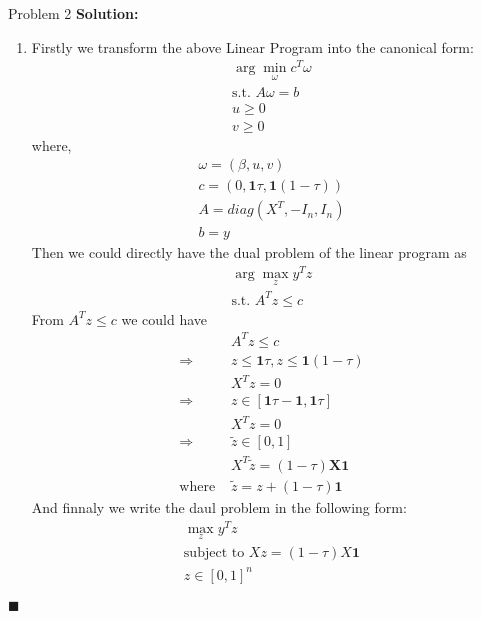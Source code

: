 \documentclass{article}
\newenvironment{solution}                               %
{\textbf{Solution:} }{$\blacksquare$}                   %
\renewcommand{\vec}[1]{\mathbf{#1}}                     %
\begin{document}
\begin{section}{Problem 2}
\begin{solution}
\begin{enumerate}[label=(\alph*)]
                \item %
                Firstly we transform the above Linear Program into the canonical form:
                \begin{gather*}
                    \arg\min\limits_{\omega} c^T \omega \\
                    \text{s.t. } A \omega = b \\
                    u \geq 0 \\
                    v \geq 0
                \end{gather*}
                where, 
                \begin{gather*}
                    \omega = (\beta, u, v) \\
                    c = (0, \vec{1}\tau, \vec{1}(1-\tau)) \\
                    A = diag(X^T, -I_n, I_n)\\
                    b = y
                \end{gather*}
                Then we could directly have the dual problem of the linear program as
                \begin{gather*}
                    \arg\max_{z} y^T z \\
                    \text{s.t. } A^T z \leq c
                \end{gather*}
                From $A^T z \leq c$ we could have
                \begin{align*}
                    & A^T z \leq c \\
                    \Rightarrow& z \leq \vec{1}\tau, z \leq \vec{1}(1-\tau) \\
                                & X^T z = 0 \\
                    \Rightarrow& z \in [\vec{1}\tau - \vec{1}, \vec{1}\tau] \\
                                & X^T z = 0 \\
                    \Rightarrow& \tilde{z} \in [0, 1] \\
                                & X^T \tilde{z} = (1-\tau) \vec{X 1} \\
                        \text{where } &\tilde{z} = z + (1-\tau) \vec{1}
                \end{align*}
                And finnaly we write the daul problem in the following form:
                \begin{gather*}
                    \max_z y^T z \\
                    \text{subject to } X z = (1 - \tau) X \vec{1} \\
                    z \in [0,1]^n
                \end{gather*}


\end{enumerate}
\end{solution}
\end{section}
\end{document}
